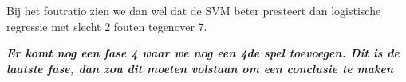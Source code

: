 Bij het foutratio zien we dan wel dat de SVM beter presteert dan logistische regressie met slecht 2 fouten tegenover 7. 



\textbf{\textit{Er komt nog een fase 4 waar we nog een 4de spel toevoegen. Dit is de laatste fase, dan zou dit moeten volstaan om een conclusie te maken}}
 